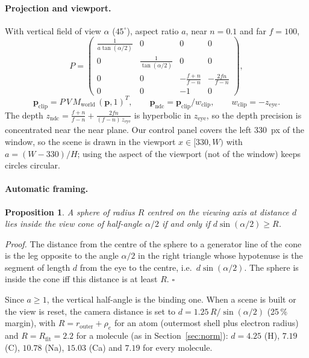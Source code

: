 \documentclass[a4paper, 11pt]{article}
\newtheorem{proposition}{{\bf Proposition}}
\begin{document}
\paragraph{Projection and viewport.} With vertical field of view $\alpha$ ($45^\circ$), aspect ratio $a$, near $n=0.1$ and far $f=100$,
\[
  P=\begin{pmatrix}
    \frac{1}{a\tan(\alpha/2)}&0&0&0\\
    0&\frac{1}{\tan(\alpha/2)}&0&0\\
    0&0&-\frac{f+n}{f-n}&-\frac{2fn}{f-n}\\
    0&0&-1&0
  \end{pmatrix},
\]
\[
  \mathbf p_{\text{clip}}=P\,V\,M_{\text{world}}\,(\mathbf p,1)^{T},\qquad
  \mathbf p_{\text{ndc}}=\mathbf p_{\text{clip}}/w_{\text{clip}},\qquad w_{\text{clip}}=-z_{\text{eye}}.
\]
The depth $z_{\text{ndc}}=\frac{f+n}{f-n}+\frac{2fn}{(f-n)\,z_{\text{eye}}}$ is hyperbolic in $z_{\text{eye}}$, so the depth precision is
concentrated near the near plane.
Our control panel covers the left $330$~px of the window, so the scene is drawn in the viewport $x\in[330,W)$ with
$a=(W-330)/H$; using the aspect of the viewport (not of the window) keeps circles circular.

\paragraph{Automatic framing.}
\begin{proposition}\label{prop:fit}
A sphere of radius $R$ centred on the viewing axis at distance $d$ lies inside the view cone of half-angle $\alpha/2$ if and only if
$d\sin(\alpha/2)\ge R$.
\end{proposition}
\noindent\textit{Proof.} The distance from the centre of the sphere to a generator line of the cone is the leg opposite to the angle $\alpha/2$
in the right triangle whose hypotenuse is the segment of length $d$ from the eye to the centre, i.e.\ $d\sin(\alpha/2)$. The sphere is inside
the cone iff this distance is at least $R$. \hfill$\square$

Since $a\ge1$, the vertical half-angle is the binding one. When a scene is built or the view is reset, the camera distance is set to
$d=1.25\,R/\sin(\alpha/2)$ (25\,\% margin), with $R=r_{\text{outer}}+\rho_e$ for an atom (outermost shell plus electron radius) and
$R=R_{\text{fit}}=2.2$ for a molecule (as in Section~\ref{sec:norm}): $d=4.25$ (H), $7.19$ (C), $10.78$ (Na), $15.03$ (Ca) and $7.19$ for every molecule.
\end{document}
